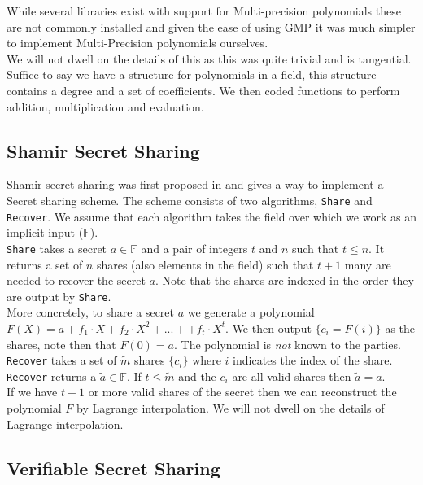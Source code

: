 \documentclass[ %
                    author={Nicholas Tutte},
                supervisor={Prof. Nigel Smart},
                    degree={MEng},
                     title={Secure Two Party Computation},
                  subtitle={A practical comparison of recent protocols},
                      type={Research - GG1K},
                      year={2015} ]{dissertation}
\begin{document}
\begin{appendices}
					While several libraries exist with support for Multi-precision polynomials these are not commonly installed and given the ease of using GMP it was much simpler to implement Multi-Precision polynomials ourselves.\\

					We will not dwell on the details of this as this was quite trivial and is tangential. Suffice to say we have a structure for polynomials in a field, this structure contains a degree and a set of coefficients. We then coded functions to perform addition, multiplication and evaluation.

				\subsection{Shamir Secret Sharing}
					Shamir secret sharing was first proposed in \cite{ShamirSecretSharing} and gives a way to implement a Secret sharing scheme. The scheme consists of two algorithms, \texttt{Share} and \texttt{Recover}. We assume that each algorithm takes the field over which we work as an implicit input ($\mathbb{F}$).\\

					\texttt{Share} takes a secret $a \in \mathbb{F}$ and a pair of integers $t$ and $n$ such that $t \leq n$. It returns a set of $n$ shares (also elements in the field) such that $t + 1$ many are needed to recover the secret $a$. Note that the shares are indexed in the order they are output by \texttt{Share}.\\

					More concretely, to share a secret $a$ we generate a polynomial $F(X) = a + f_1 \cdot X + f_2 \cdot X^2 + ... +  + f_t \cdot X ^ t$. We then output $\{c_i = F(i)\}$ as the shares, note then that $F(0) = a$. The polynomial is \emph{not} known to the parties.\\

					\texttt{Recover} takes a set of $\tilde m$ shares $\{c_i\}$ where $i$ indicates the index of the share. \texttt{Recover} returns a $ \tilde a \in \mathbb{F}$. If $t \leq \tilde m$ and the $c_i$ are all valid shares then $\tilde a = a$.\\

					If we have $t + 1$ or more valid shares of the secret then we can reconstruct the polynomial $F$ by Lagrange interpolation. We will not dwell on the details of Lagrange interpolation.\\

				\subsection{Verifiable Secret Sharing}


\end{appendices}
\end{document}
